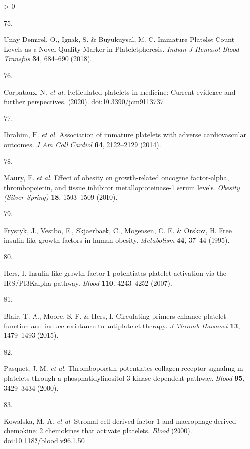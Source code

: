 \documentclass[11pt,twoside]{bristolthesis}
\newlength{\cslhangindent}
\newlength{\csllabelwidth}
\newenvironment{CSLReferences}[2] %
 {%
  \setlength{\parindent}{0pt}
  \ifodd #1 \everypar{\setlength{\hangindent}{\cslhangindent}}\ignorespaces\fi
  \ifnum #2 > 0
  \setlength{\parskip}{#2\baselineskip}
  \fi
 }%
 {}
\newcommand{\CSLLeftMargin}[1]{\parbox[t]{\csllabelwidth}{#1}}
\newcommand{\CSLRightInline}[1]{\parbox[t]{\linewidth - \csllabelwidth}{#1}\break}
\begin{document}
\begin{CSLReferences}{0}{0}
\leavevmode\hypertarget{ref-UnayDemirel2018a}{}%
\CSLLeftMargin{75. }
\CSLRightInline{Unay Demirel, O., Ignak, S. \& Buyukuysal, M. C. {Immature Platelet Count Levels as a Novel Quality Marker in Plateletpheresis}. \emph{Indian J Hematol Blood Transfus} \textbf{34}, 684--690 (2018).}

\leavevmode\hypertarget{ref-Corpataux2020}{}%
\CSLLeftMargin{76. }
\CSLRightInline{Corpataux, N. \emph{et al.} {Reticulated platelets in medicine: Current evidence and further perspectives}. (2020). doi:\href{https://doi.org/10.3390/jcm9113737}{10.3390/jcm9113737}}

\leavevmode\hypertarget{ref-Ibrahim2014}{}%
\CSLLeftMargin{77. }
\CSLRightInline{Ibrahim, H. \emph{et al.} {Association of immature platelets with adverse cardiovascular outcomes}. \emph{J Am Coll Cardiol} \textbf{64}, 2122--2129 (2014).}

\leavevmode\hypertarget{ref-Maury2010a}{}%
\CSLLeftMargin{78. }
\CSLRightInline{Maury, E. \emph{et al.} {Effect of obesity on growth-related oncogene factor-alpha, thrombopoietin, and tissue inhibitor metalloproteinase-1 serum levels}. \emph{Obesity (Silver Spring)} \textbf{18}, 1503--1509 (2010).}

\leavevmode\hypertarget{ref-Frystyk1995}{}%
\CSLLeftMargin{79. }
\CSLRightInline{Frystyk, J., Vestbo, E., Skjaerbaek, C., Mogensen, C. E. \& Orskov, H. {Free insulin-like growth factors in human obesity}. \emph{Metabolism} \textbf{44}, 37--44 (1995).}

\leavevmode\hypertarget{ref-Hers2007}{}%
\CSLLeftMargin{80. }
\CSLRightInline{Hers, I. {Insulin-like growth factor-1 potentiates platelet activation via the IRS/PI3Kalpha pathway}. \emph{Blood} \textbf{110}, 4243--4252 (2007).}

\leavevmode\hypertarget{ref-Blair2015}{}%
\CSLLeftMargin{81. }
\CSLRightInline{Blair, T. A., Moore, S. F. \& Hers, I. {Circulating primers enhance platelet function and induce resistance to antiplatelet therapy}. \emph{J Thromb Haemost} \textbf{13}, 1479--1493 (2015).}

\leavevmode\hypertarget{ref-Pasquet2000}{}%
\CSLLeftMargin{82. }
\CSLRightInline{Pasquet, J. M. \emph{et al.} {Thrombopoietin potentiates collagen receptor signaling in platelets through a phosphatidylinositol 3-kinase-dependent pathway}. \emph{Blood} \textbf{95}, 3429--3434 (2000).}

\leavevmode\hypertarget{ref-Kowalska2000}{}%
\CSLLeftMargin{83. }
\CSLRightInline{Kowalska, M. A. \emph{et al.} {Stromal cell-derived factor-1 and macrophage-derived chemokine: 2 chemokines that activate platelets}. \emph{Blood} (2000). doi:\href{https://doi.org/10.1182/blood.v96.1.50}{10.1182/blood.v96.1.50}}


\end{CSLReferences}
\end{document}
